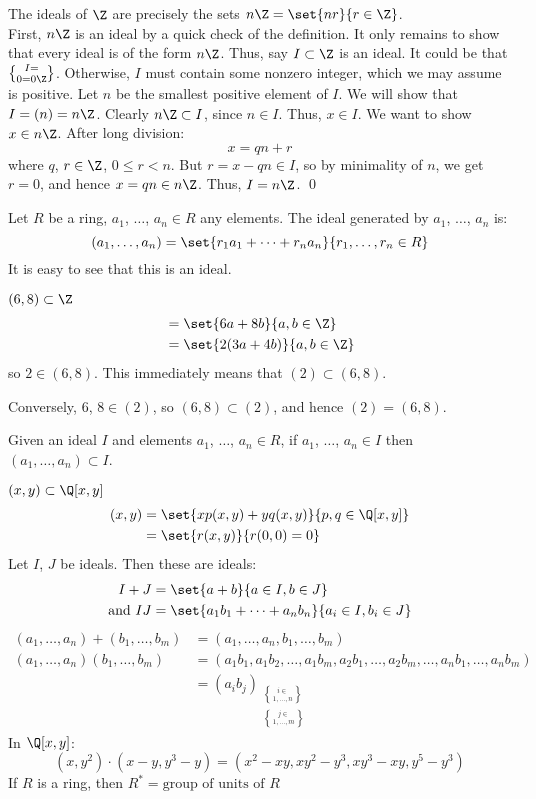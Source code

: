 \claim The ideals of $\Z$ are precisely the sets $n\Z=\set{nr}{r\in\Z}$. \\
\pf First, $n\Z$ is an ideal by a quick check of the definition.  It only remains to show that every ideal is of the form $n\Z$.
Thus, say $I\subset\Z$ is an ideal.  It could be that $I=\brace0=0\Z$.  Otherwise, $I$ must contain some nonzero integer, which we may assume is positive.  Let $n$ be the smallest positive element of $I$.  We will show that $I=(n)=n\Z$.
Clearly $n\Z\subset I$, since $n\in I$.  Thus, $x\in I$.  We want to show $x\in n\Z$.  After long division:
\[ x = qn + r \]
where $q$, $r\in\Z$, $0\leq r<n$.  But $r=x-qn\in I$, so by minimality of $n$, we get $r=0$, and hence $x=qn\in n\Z$.
Thus, $I=n\Z$. \qed

 Let $R$ be a ring, $a_1$, $\dotsc$, $a_n\in R$ any elements.  The ideal generated by $a_1$, $\dotsc$, $a_n$ is:
\[ (a_1,\dotsc,a_n) = \set{r_1a_1+\dotsb+r_na_n}{r_1,\dotsc,r_n\in R} \]
It is easy to see that this is an ideal.

\eg $(6,8)\subset\Z$
\begin{align*}
&= \set{6a+8b}{a,b\in\Z} \\
&= \set{2(3a+4b)}{a,b\in\Z}
\end{align*}
so $2\in(6,8)$.  This immediately means that $(2)\subset(6,8)$.

Conversely, $6$, $8\in(2)$, so $(6,8)\subset(2)$, and hence $(2)=(6,8)$.

\fact Given an ideal $I$ and elements $a_1$, $\dotsc$, $a_n\in R$, if $a_1$, $\dotsc$, $a_n\in I$ then $(a_1,\dotsc,a_n)\subset I$.

\eg $(x,y)\subset\Q[x,y]$
\begin{align*}
(x,y) &= \set{xp(x,y)+yq(x,y)}{p,q\in\Q[x,y]} \\
&= \set{r(x,y)}{r(0,0)=0}
\end{align*}
%
 Let $I$, $J$ be ideals.  Then these are ideals:
\begin{align*}
I + J &= \set{a+b}{a\in I, b\in J} \\
\text{and } IJ &= \set{a_1b_1+\dotsb+a_nb_n}{a_i\in I, b_i\in J}
\end{align*}
\begin{align*}
(a_1,\dotsc,a_n) + (b_1,\dotsc,b_m) &= (a_1,\dotsc,a_n,b_1,\dotsc,b_m) \\
(a_1,\dotsc,a_n)(b_1,\dotsc,b_m) &= (a_1b_1,a_1b_2,\dotsc,a_1b_m,a_2b_1,\dotsc,a_2b_m,\dotsc,a_nb_1,\dotsc,a_nb_m) \\
&= (a_ib_j)_{\substack{i\in\brace{1,\dotsc,n}\\j\in\brace{1,\dotsc,m}}}
\end{align*}
\eg In $\Q[x,y]$:
\[ (x,y^2)\cdot(x-y,y^3-y)=(x^2-xy,xy^2-y^3,xy^3-xy,y^5-y^3) \]
If $R$ is a ring, then $R^*=\text{group of units of $R$}$

